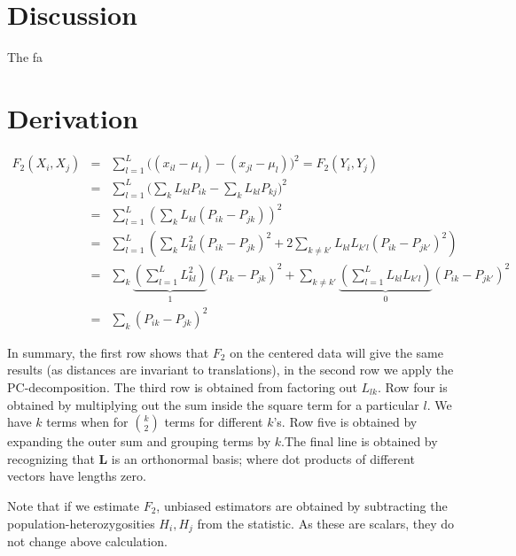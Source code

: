 \documentclass[12pt,a4pape, fullpage]{article}
\newcommand{\ML}{\mathbf{L}} %
\begin{document}
\section{Discussion}
The fa



\appendix
\section{Derivation}\label{appendix:fonpc}
\begin{eqnarray}
F_2(X_i, X_j) &=& \sum_{l=1}^L \big( (x_{il} - \mu_l) -(x_{jl} -\mu_l)\big)^2 = F_2(Y_i, Y_j)\nonumber\\
&=& \sum_{l=1}^L \big( \sum_k L_{kl}P_{ik} - \sum_kL_{kl}P_{kj}\big)^2\nonumber\\
&=& \sum_{l=1}^L \left( \sum_k L_{kl} (P_{ik} -P_{jk}) \right)^2\nonumber\\
&=& \sum_{l=1}^L \left( \sum_k L_{kl}^2 (P_{ik} -P_{jk})^2 + 2\sum_{k\neq k'} L_{kl}L_{k'l}(P_{ik} - P_{jk'})^2 \right)\nonumber\\
&=& \sum_k \underbrace{\left(\sum_{l=1}^L L_{kl}^2\right)}_1 (P_{ik} -P_{jk})^2 + \sum_{k\neq k'}\underbrace{\left(\sum_{l=1}^L L_{kl}L_{k'l}\right)}_{0} (P_{ik} - P_{jk'})^2\nonumber\\
&=& \sum_k (P_{ik} - P_{jk})^2
\end{eqnarray}

In summary, the first row shows that $F_2$ on the centered data will give the same results (as distances are invariant to translations), in the second row we apply the PC-decomposition. The third row is obtained from factoring out $L_{lk}$. Row four is obtained by multiplying out the sum inside the square term for a particular $l$. We have $k$ terms when for $\binom{k}{2}$ terms for different $k$'s.  Row five is obtained by expanding the outer sum and grouping terms by $k$.The final line is obtained by recognizing that $\ML$ is an orthonormal basis; where dot products of different vectors have lengths zero.

Note that if we estimate $F_2$, unbiased estimators are obtained by subtracting the population-heterozygosities $H_i, H_j$ from the statistic. As these are scalars, they do not change above calculation.

\end{document}
